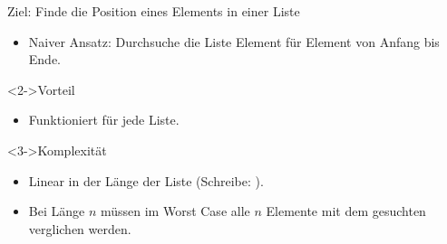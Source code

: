 \begin{frame}
    \begin{block}{Ziel: Finde die Position eines Elements in einer Liste}
        \begin{itemize}
            \item Naiver Ansatz: Durchsuche die Liste Element für Element von Anfang bis Ende.
        \end{itemize}
    \end{block}
    \begin{block}<2->{Vorteil}
        \begin{itemize}
            \item Funktioniert für jede Liste.
        \end{itemize}
    \end{block}
    \begin{block}<3->{Komplexität}
        \begin{itemize}
            \item Linear in der Länge der Liste  (Schreibe: \alert{\olin}).
            \item Bei Länge $n$ müssen im Worst Case alle $n$ Elemente mit dem gesuchten verglichen werden. 
        \end{itemize}
    \end{block}
\end{frame}

